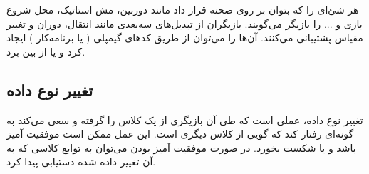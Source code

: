 هر شئ‌ای را که بتوان بر روی صحنه قرار داد مانند دوربین، مش استاتیک، محل شروع بازی و ... را بازیگر
می‌گویند.
بازیگران از تبدیل‌های سه‌بعدی مانند انتقال، دوران و تغییر مقیاس پشتیبانی می‌کنند.
آن‌ها را می‌توان از طریق کد‌های گیمپلی (
	یا برنامه‌کار 
)
ایجاد کرد و یا از بین برد.

\subsection{تغییر نوع داده 
\protect{}}

تغییر نوع داده، عملی است که طی آن بازیگری از یک کلاس را گرفته و سعی می‌کند به گونه‌ای رفتار کند که گویی از کلاس دیگری است.
این عمل ممکن است موفقیت آمیز باشد و یا شکست بخورد. در صورت موفقیت آمیز بودن می‌توان به توابع کلاسی که به آن تغییر داده شده دستیابی پیدا کرد.

